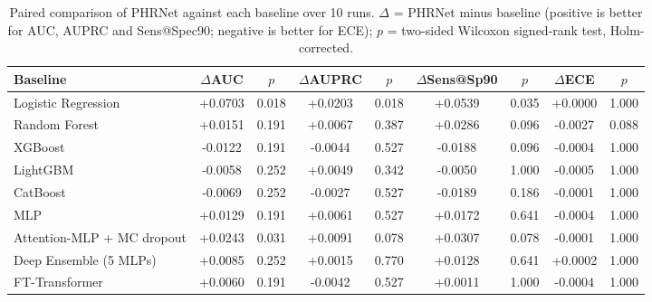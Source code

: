 \begin{table}[t]
\centering
\caption{Paired comparison of PHRNet against each baseline over 10 runs. $\Delta$ = PHRNet minus baseline (positive is better for AUC, AUPRC and Sens@Spec90; negative is better for ECE); $p$ = two-sided Wilcoxon signed-rank test, Holm-corrected.}
\label{tab:stats}
\footnotesize
\setlength{\tabcolsep}{3pt}
\begin{tabular}{lcccccccc}
\toprule
\textbf{Baseline} & $\Delta$AUC & $p$ & $\Delta$AUPRC & $p$ & $\Delta$Sens@Sp90 & $p$ & $\Delta$ECE & $p$ \\
\midrule
Logistic Regression & +0.0703 & 0.018 & +0.0203 & 0.018 & +0.0539 & 0.035 & +0.0000 & 1.000 \\
Random Forest & +0.0151 & 0.191 & +0.0067 & 0.387 & +0.0286 & 0.096 & -0.0027 & 0.088 \\
XGBoost & -0.0122 & 0.191 & -0.0044 & 0.527 & -0.0188 & 0.096 & -0.0004 & 1.000 \\
LightGBM & -0.0058 & 0.252 & +0.0049 & 0.342 & -0.0050 & 1.000 & -0.0005 & 1.000 \\
CatBoost & -0.0069 & 0.252 & -0.0027 & 0.527 & -0.0189 & 0.186 & -0.0001 & 1.000 \\
MLP & +0.0129 & 0.191 & +0.0061 & 0.527 & +0.0172 & 0.641 & -0.0004 & 1.000 \\
Attention-MLP + MC dropout & +0.0243 & 0.031 & +0.0091 & 0.078 & +0.0307 & 0.078 & -0.0001 & 1.000 \\
Deep Ensemble (5 MLPs) & +0.0085 & 0.252 & +0.0015 & 0.770 & +0.0128 & 0.641 & +0.0002 & 1.000 \\
FT-Transformer & +0.0060 & 0.191 & -0.0042 & 0.527 & +0.0011 & 1.000 & -0.0004 & 1.000 \\
\bottomrule
\end{tabular}
\end{table}